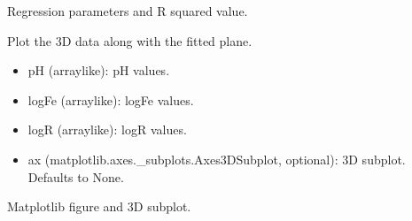 \documentclass[a4paper,10pt,english]{sphinxmanual}
\begin{document}
\begin{fulllineitems}
\begin{fulllineitems}
\begin{description}
\begin{itemize}
\end{itemize}

\sphinxAtStartPar
Regression parameters and R squared value.

\end{description}

\end{fulllineitems}


\begin{fulllineitems}
\label{\detokenize{utils:src.utils.plane3D_plot.Plane3DPlotter.plot_3D_data}}
\pysigstartsignatures
{}
\pysigstopsignatures
\sphinxAtStartPar
Plot the 3D data along with the fitted plane.
\begin{description}
\begin{itemize}
\item {} 
\sphinxAtStartPar
pH (array\sphinxhyphen{}like): pH values.

\item {} 
\sphinxAtStartPar
logFe (array\sphinxhyphen{}like): logFe values.

\item {} 
\sphinxAtStartPar
logR (array\sphinxhyphen{}like): logR values.

\item {} 
\sphinxAtStartPar
ax (matplotlib.axes.\_subplots.Axes3DSubplot, optional): 3D subplot. Defaults to None.

\end{itemize}

\sphinxAtStartPar
Matplotlib figure and 3D subplot.

\end{description}

\end{fulllineitems}



\end{fulllineitems}
\end{document}
